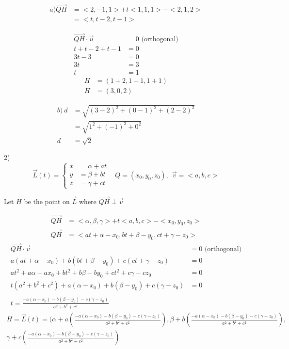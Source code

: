\documentclass{article}
\begin{document}
\begin{align*}
a) \vec{QH} &= <2, -1, 1> + t<1,1,1> - <2,1,2> \\
&= <t, t-2, t-1>
\end{align*}

\begin{align*}
\vec{QH} \cdot \vec{u} &= 0  \text{ (orthogonal)}\\
t + t - 2 + t -1 &= 0 \\
3t - 3 &= 0 \\
3t &= 3 \\
t &= 1
\end{align*}
\begin{align*}
H &= (1+2, 1-1, 1+1) \\
H &= (3, 0, 2)
\end{align*}

\begin{align*}
b) \: d &= \sqrt{(3-2)^2 + (0-1)^2 + (2-2)^2} \\
&= \sqrt{1^2 + (-1)^2 + 0^2} \\
d &= \sqrt{2}
\end{align*}

2)
\[\vec{L}(t) = \left\{
  \begin{array}{lr}
    x &= \alpha + at \\
    y &= \beta + bt \\
    z &= \gamma + ct
  \end{array}
\right.
\;\;\;
Q = (x_0, y_0, z_0) , \:\: \vec{v} = <a, b, c>
\]
\begin{center}
Let $H$ be the point on $\vec{L}$ where $\vec{QH} \perp \vec{v}$
\end{center}

\begin{align*}
\vec{QH} &= <\alpha, \beta, \gamma> + t<a, b, c> - <x_0, y_0, z_0> \\
\vec{QH} &= <at + \alpha - x_0, bt + \beta - y_0, ct + \gamma - z_0>
\end{align*}
\begin{align*}
\vec{QH} \cdot \vec{v} &= 0  \text{ (orthogonal)} \\
a(at + \alpha - x_0) + b(bt + \beta - y_0) + c(ct + \gamma - z_0) &= 0 \\
at^2 + a\alpha - ax_0 + bt^2 + b\beta - by_0 + ct^2 + c\gamma - cz_0 &= 0 \\
t(a^2 + b^2 + c^2) + a(\alpha - x_0) + b(\beta - y_0) + c(\gamma - z_0) &= 0 \\
\\
t = \frac{-a(\alpha - x_0) - b(\beta - y_0) - c(\gamma - z_0)}{a^2+b^2+c^2}
\end{align*}
\begin{equation*}
\begin{multlined}
H = \vec{L}(t) = (\alpha + a(\frac{-a(\alpha - x_0) - b(\beta - y_0) - c(\gamma - z_0)}{a^2+b^2+c^2}), \beta + b(\frac{-a(\alpha - x_0) - b(\beta - y_0) - c(\gamma - z_0)}{a^2+b^2+c^2}), \\\gamma + c(\frac{-a(\alpha - x_0) - b(\beta - y_0) - c(\gamma - z_0)}{a^2+b^2+c^2})
\end{multlined}
\end{equation*}
\end{document}

